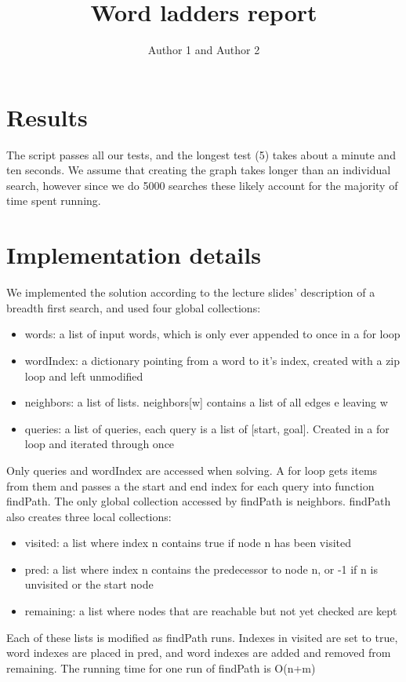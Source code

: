 \documentclass{article}
\title{Word ladders report}
\author{Author 1 and Author 2}
\begin{document}
  \maketitle

  \section{Results}

The script passes all our tests, and the longest test (5) takes about a minute and ten seconds. We assume that creating the graph takes longer than an individual search, however since we do 5000 searches these likely account for the majority of time spent running.

  \section{Implementation details}
  
We implemented the solution according to the lecture slides' description of a breadth first search, and used four global collections:
\begin{itemize}
	\item words: a list of input words, which is only ever appended to once in a for loop
	\item wordIndex: a dictionary pointing from a word to it's index, created with a zip loop and left unmodified
	\item neighbors: a list of lists. neighbors[w] contains a list of all edges e leaving w
	\item queries: a list of queries, each query is a list of [start, goal]. Created in a for loop and iterated through once
\end{itemize} 

Only queries and wordIndex are accessed when solving. A for loop gets items from them and passes a the start and end index for each query into function findPath. The only global collection accessed by findPath is neighbors. findPath also creates three local collections:
\begin{itemize}
	\item visited: a list where index n contains true if node n has been visited
	\item pred: a list where index n contains the predecessor to node n, or -1 if n is unvisited or the start node
	\item remaining: a list where nodes that are reachable but not yet checked are kept
\end{itemize} 

Each of these lists is modified as findPath runs. Indexes in visited are set to true, word indexes are placed in pred, and word indexes are added and removed from remaining. The running time for one run of findPath is O(n+m)
\end{document}
